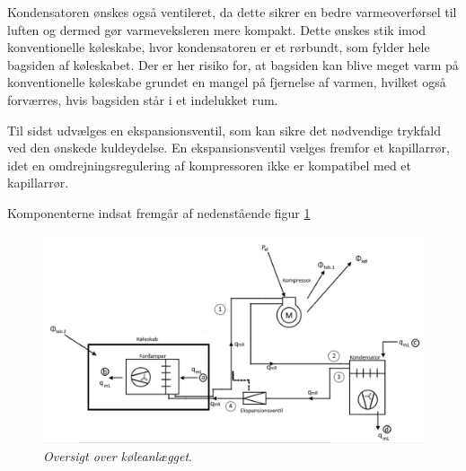\documentclass[../Hovedrapport.tex]{subfiles}
\begin{document}
Kondensatoren ønskes også ventileret, da dette sikrer en bedre varmeoverførsel til luften og dermed gør varmeveksleren mere kompakt. Dette ønskes stik imod konventionelle køleskabe, hvor kondensatoren er et rørbundt, som fylder hele bagsiden af køleskabet. Der er her risiko for, at bagsiden kan blive meget varm på konventionelle køleskabe grundet en mangel på fjernelse af varmen, hvilket også forværres, hvis bagsiden står i et indelukket rum.

Til sidst udvælges en ekspansionsventil, som kan sikre det nødvendige trykfald ved den ønskede kuldeydelse. En ekspansionsventil vælges fremfor et kapillarrør, idet en omdrejningsregulering af kompressoren ikke er kompatibel med et kapillarrør.

Komponenterne indsat fremgår af nedenstående figur \ref{fig:Anlægsoversigt}
\begin{figure}[H] %
	\centering
	\includegraphics[width=1\textwidth]{Billeder/uden_KF.png}
	\caption{\textit{Oversigt over køleanlægget}.}
	\label{fig:Anlægsoversigt}
\end{figure}
\end{document}
